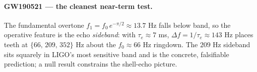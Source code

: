 \paragraph{GW190521 --- the cleanest near-term test.} The fundamental overtone $f_1=f_0\,e^{-\pi/2}\approx13.7$ Hz falls below band, so the operative feature is the echo \emph{sideband}: with $\tau_e\approx7$ ms, $\Delta f=1/\tau_e\approx143$ Hz places teeth at $\{66,\,209,\,352\}$ Hz about the $f_0\approx66$ Hz ringdown. The $209$ Hz sideband sits squarely in LIGO's most sensitive band and is the concrete, falsifiable prediction; a null result constrains the shell-echo picture.
